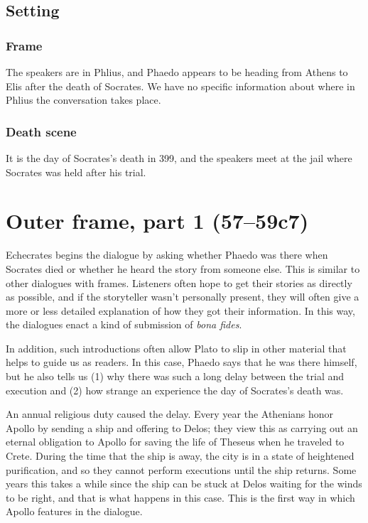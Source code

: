 \documentclass[12pt,letterpaper]{article}
\begin{document}

\subsection{Setting}

\subsubsection{Frame}

The speakers are in Phlius, and Phaedo appears to be heading from Athens to Elis after the death of Socrates. We have no specific information about where in Phlius the conversation takes place.

\subsubsection{Death scene}

It is the day of Socrates's death in 399, and the speakers meet at the jail where Socrates was held after his trial.



\section{Outer frame, part 1 (57--59c7)}

Echecrates begins the dialogue by asking whether Phaedo was there when Socrates died or whether he heard the story from someone else. This is similar to other dialogues with frames. Listeners often hope to get their stories as directly as possible, and if the storyteller wasn't personally present, they will often give a more or less detailed explanation of how they got their information. In this way, the dialogues enact a kind of submission of \textit{bona fides}.

In addition, such introductions often allow Plato to slip in other material that helps to guide us as readers. In this case, Phaedo says that he was there himself, but he also tells us (1) why there was such a long delay between the trial and execution and (2) how strange an experience the day of Socrates's death was.

An annual religious duty caused the delay. Every year the Athenians honor Apollo by sending a ship and offering to Delos; they view this as carrying out an eternal obligation to Apollo for saving the life of Theseus when he traveled to Crete. During the time that the ship is away, the city is in a state of heightened purification, and so they cannot perform executions until the ship returns. Some years this takes a while since the ship can be stuck at Delos waiting for the winds to be right, and that is what happens in this case. This is the first way in which Apollo features in the dialogue.
\end{document}

